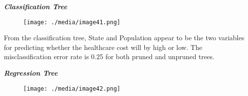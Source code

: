 \documentclass[12pt]{article}
\begin{document}
\vspace{\baselineskip}
\textbf{\textit{Classification Tree }}\par




\begin{figure}[H]
	\begin{Center}
		\texttt{[image: ./media/image41.png]}
	\end{Center}
\end{figure}



\par

\begin{justify}
From the classification tree, State and Population appear to be the two variables for predicting whether the healthcare cost will by high or low. The misclassification error rate is 0.25 for both pruned and unpruned trees.
\end{justify}\par


\vspace{\baselineskip}

\vspace{\baselineskip}

\vspace{\baselineskip}

\vspace{\baselineskip}

\vspace{\baselineskip}

\vspace{\baselineskip}

\vspace{\baselineskip}
\begin{justify}
\textbf{\textit{Regression Tree}}
\end{justify}\par




\begin{figure}[H]
	\begin{Center}
		\texttt{[image: ./media/image42.png]}
	\end{Center}
\end{figure}
\end{document}
